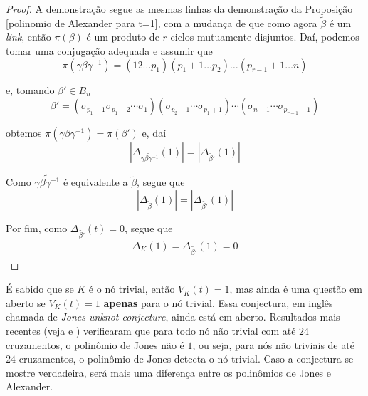 \documentclass[a4paper,portuguese,11pt,twoside, leqno]{book}
\theoremstyle{definition}
\begin{document}
	\begin{proof}
		A demonstração segue as mesmas linhas da demonstração da Proposição \eqref{polinomio de Alexander para t=1}, com a mudança de que como agora $\widetilde{\beta}$ é um \textit{link}, então $\pi(\beta)$ é um produto de $r$ ciclos mutuamente disjuntos. Daí, podemos tomar uma conjugação adequada e assumir que 
		\begin{equation*}
		\pi(\gamma\beta\gamma^{-1}) = (12\dots p_1)(p_1+1\dots p_2)\dots(p_{r-1}+1\dots n)
		\end{equation*}
		\par\vspace{0.3cm} e, tomando $\beta'\in B_n$
		\begin{equation*}
		\beta' = (\sigma_{p_1-1}\sigma_{p_1-2}\cdots\sigma_1)(\sigma_{p_2-1}\cdots\sigma_{p_1+1})\cdots( \sigma_{n-1}\cdots\sigma_{p_{r-1} + 1} )
		\end{equation*}
		\par\vspace{0.3cm} obtemos $\pi(\gamma\beta\gamma^{-1}) = \pi(\beta')$ e, daí
		\begin{equation*}
		|\Delta_{\widetilde{\gamma\beta\gamma^{-1}}}(1)| = | \Delta_{\widetilde{\beta'}}(1) |
		\end{equation*}
		\par\vspace{0.3cm} Como $\widetilde{\gamma\beta\gamma^{-1}}$ é equivalente a $\widetilde{\beta}$, segue que
		\begin{equation*}
		|\Delta_{\widetilde{\beta}}(1)| = | \Delta_{\widetilde{\beta'}}(1) |
		\end{equation*} 
		\par\vspace{0.3cm} Por fim, como $\Delta_{\widetilde{\beta'}}(t) = 0$, segue que
		\begin{align*}
		\Delta_K(1) = \Delta_{\widetilde{\beta'}}(1) = 0
		\end{align*} 
	\end{proof}
	\par\vspace{0.3cm} É sabido que se $K$ é o nó trivial, então $V_K(t) = 1$, mas ainda é uma questão em aberto se $V_K(t) = 1$ \textbf{apenas} para o nó trivial. Essa conjectura, em inglês chamada de \textit{Jones unknot conjecture}, ainda está em aberto. Resultados mais recentes (veja \cite{Jones detecta no trivial 1} e \cite{Jones detecta no trivial 2}) verificaram que para todo nó não trivial com até $24$ cruzamentos, o polinômio de Jones não é $1$, ou seja, para nós não triviais de até $24$ cruzamentos, o polinômio de Jones detecta o nó trivial. Caso a conjectura se mostre verdadeira, será mais uma diferença entre os polinômios de Jones e Alexander.
\end{document}
